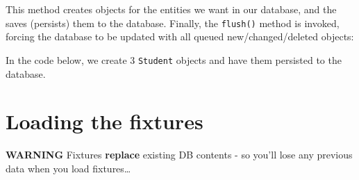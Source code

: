\documentclass[a4paperpaper,openright]{book}
\newenvironment{Shaded}{}{}
\newcommand{\FunctionTok}[1]{\textcolor[rgb]{0.02,0.16,0.49}{#1}}
\newcommand{\KeywordTok}[1]{\textcolor[rgb]{0.00,0.44,0.13}{\textbf{#1}}}
\newcommand{\NormalTok}[1]{#1}
\newcommand{\OtherTok}[1]{\textcolor[rgb]{0.00,0.44,0.13}{#1}}
\newcommand{\StringTok}[1]{\textcolor[rgb]{0.25,0.44,0.63}{#1}}
\begin{document}
This method creates objects for the entities we want in our database,
and the saves (persists) them to the database. Finally, the
\texttt{flush()} method is invoked, forcing the database to be updated
with all queued new/changed/deleted objects:

In the code below, we create 3 \texttt{Student} objects and have them
persisted to the database.

\begin{Shaded}
\end{Shaded}

\hypertarget{loading-the-fixtures}{%
\section{Loading the fixtures}\label{loading-the-fixtures}}

\textbf{WARNING} Fixtures \textbf{replace} existing DB contents - so
you'll lose any previous data when you load fixtures\ldots{}
\end{document}
